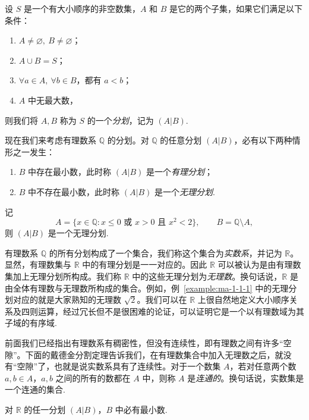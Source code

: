 \begin{definition}\label{definition:ma-1-1-1}
设 $S$ 是一个有大小顺序的非空数集，$A$ 和 $B$ 是它的两个子集，如果它们满足以下条件：
\begin{enumerate}
  \item $A\ne\varnothing,\ B\ne\varnothing$；
  \item $A\cup B=S$；
  \item $\forall a\in A,\ \forall b\in B$，都有 $a<b$；
  \item $A$ 中无最大数，
\end{enumerate}
则我们将 $A,B$ 称为 $S$ 的一个\emph{分划}，记为 $(A|B)$.
\end{definition}

现在我们来考虑有理数系 $\mathbb{Q}$ 的分划。对 $\mathbb{Q}$ 的任意分划 $(A|B)$，必有以下两种情形之一发生：
\begin{enumerate}
  \item $B$ 中存在最小数，此时称 $(A|B)$ 是一个\emph{有理分划}；
  \item $B$ 中不存在最小数，此时称 $(A|B)$ 是一个\emph{无理分划}.
\end{enumerate}

\begin{example}\label{example:ma-1-1-1}
记
\[
  A=\{x\in\mathbb{Q}:x\leqslant0\text{ 或 }x>0\text{ 且 }x^2<2\},\qquad B=\mathbb{Q}\setminus A,
\]
则 $(A|B)$ 是一个无理分划.
\end{example}

有理数系 $\mathbb{Q}$ 的所有分划构成了一个集合，我们称这个集合为\emph{实数系}，并记为 $\mathbb{R}$。显然，有理数集与 $\mathbb{R}$ 中的有理分划是一一对应的。因此 $\mathbb{R}$ 可以被认为是由有理数集加上无理分划所构成。我们称 $\mathbb{R}$ 中的这些无理分划为\emph{无理数}。换句话说，$\mathbb{R}$ 是由全体有理数与无理数所构成的集合。例如，例~\ref{example:ma-1-1-1} 中的无理分划对应的就是大家熟知的无理数 $\sqrt{2}$。我们可以在 $\mathbb{R}$ 上很自然地定义大小顺序关系及四则运算，经过冗长但不是很困难的论证，可以证明它是一个以有理数域为其子域的有序域.

前面我们已经指出有理数系有稠密性，但没有连续性，即有理数之间有许多``空隙''。下面的戴德金分割定理告诉我们，在有理数集合中加入无理数之后，就没有``空隙''了，也就是说实数系具有了连续性。对于一个数集 $A$，若对任意两个数 $a,b\in A$，$a,b$ 之间的所有的数都在 $A$ 中，则称 $A$ 是\emph{连通的}。换句话说，实数集是一个连通的集合.

\begin{theorem}[{戴德金分割定理}]\label{theorem:ma-1-1-1}
对 $\mathbb{R}$ 的任一分划 $(A|B)$，$B$ 中必有最小数.
\end{theorem}

